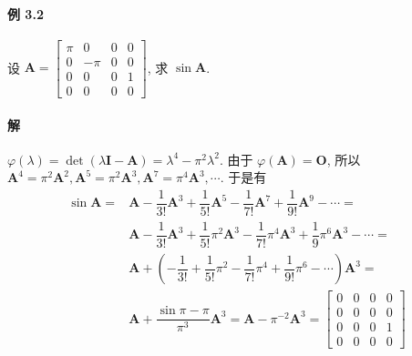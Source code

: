 \paragraph*{例 3.2} 设 $\bm{A} = \begin{bmatrix}
        \pi & 0    & 0 & 0 \\
        0   & -\pi & 0 & 0 \\
        0   & 0    & 0 & 1 \\
        0   & 0    & 0 & 0
    \end{bmatrix}$, 求 $\sin \bm{A}$.

\paragraph*{解} $\varphi(\lambda) = \det(\lambda\bm{I} - \bm{A}) = \lambda^4 - \pi^2\lambda^2$. 由于 $\varphi(\bm{A}) = \bm{O}$, 所以 $\bm{A}^4 = \pi^2\bm{A}^2, \bm{A}^5 = \pi^2\bm{A}^3, \bm{A}^7 = \pi^4\bm{A}^3, \cdots$. 于是有
\begin{align*}
    \sin\bm{A} = & \bm{A} - \dfrac{1}{3!}\bm{A}^3 + \dfrac{1}{5!}\bm{A}^5 - \dfrac{1}{7!}\bm{A}^7 + \dfrac{1}{9!}\bm{A}^9 - \cdots =               \\
                 & \bm{A} - \dfrac{1}{3!}\bm{A}^3 + \dfrac{1}{5!}\pi^2\bm{A}^3 - \dfrac{1}{7!}\pi^4\bm{A}^3 + \dfrac{1}{9}\pi^6\bm{A}^3 - \cdots = \\
                 & \bm{A} + (-\dfrac{1}{3!} + \dfrac{1}{5!}\pi^2 - \dfrac{1}{7!}\pi^4 + \dfrac{1}{9!}\pi^6 - \cdots)\bm{A}^3 =                     \\
                 & \bm{A} + \dfrac{\sin\pi - \pi}{\pi^3} \bm{A}^3 = \bm{A} - \pi^{-2}\bm{A}^3 = \begin{bmatrix}
                                                                                                    0 & 0 & 0 & 0 \\
                                                                                                    0 & 0 & 0 & 0 \\
                                                                                                    0 & 0 & 0 & 1 \\
                                                                                                    0 & 0 & 0 & 0
                                                                                                \end{bmatrix}
\end{align*}

